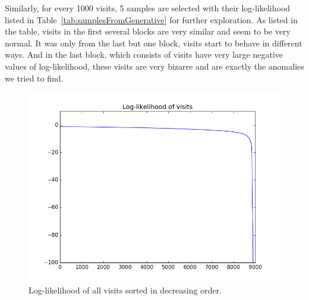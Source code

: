 Similarly, for every 1000 visits, 5 samples are selected with their log-likelihood listed in Table~\ref{tab:samplesFromGenerative} for further exploration. As listed in the table, visits in the first several blocks are very similar and seem to be very normal. It was only from the last but one block, visits start to behave in different ways. And in the last block, which consists of visits have very large negative values of log-likelihood, these visits are very bizarre and are exactly the anomalies we tried to find.


\begin{figure}[!ht]
	\begin{center}
		\includegraphics[width=\textwidth]{images/likelihood}
		\caption{Log-likelihood of all visits sorted in decreasing order.}
		\label{fig:likelihood}
	\end{center}
\end{figure}

